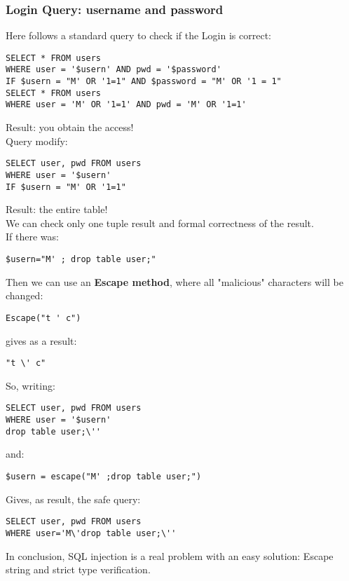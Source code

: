 \subsubsection{Login Query: username and password} 
Here follows a standard query to check if the Login is correct:
\begin{algorithm}
\begin{lstlisting}
SELECT * FROM users 
WHERE user = '$usern' AND pwd = '$password'
IF $usern = "M' OR '1=1" AND $password = "M' OR '1 = 1" 
SELECT * FROM users 
WHERE user = 'M' OR '1=1' AND pwd = 'M' OR '1=1'
\end{lstlisting}
\end{algorithm}
Result: you obtain the access!\\
Query modify:
\begin{algorithm}
\begin{lstlisting}
SELECT user, pwd FROM users 
WHERE user = '$usern' 
IF $usern = "M' OR '1=1" 
\end{lstlisting}
\end{algorithm}
Result: the entire table!\\
We can check only one tuple result and formal correctness of the result.\\
If there was:  
\begin{lstlisting} 
$usern="M' ; drop table user;"
\end{lstlisting}
Then we can use an \textbf{Escape method}, where all "malicious" characters will be changed:
\begin{lstlisting} 
Escape("t ' c") 
\end{lstlisting}
gives as a result:
\begin{lstlisting} 
"t \' c"
\end{lstlisting}
So, writing:
\begin{lstlisting} 
SELECT user, pwd FROM users 
WHERE user = '$usern'
drop table user;\''
\end{lstlisting}
and:
\begin{lstlisting} 
$usern = escape("M' ;drop table user;")
\end{lstlisting}
Gives, as result, the safe query:
\begin{lstlisting} 
SELECT user, pwd FROM users 
WHERE user='M\'drop table user;\''
\end{lstlisting}
In conclusion, SQL injection is a real problem with an easy solution: Escape string and strict type verification.
